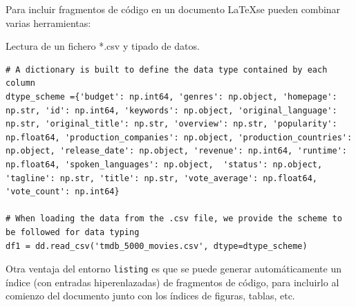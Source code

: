 \documentclass[a4paper, 12pt]{book}
\begin{document}
Para incluir fragmentos de código en un documento \LaTeX se pueden combinar varias
herramientas:


\begin{listing}[h!]
    \caption{Lectura de un fichero *.csv y tipado de datos.}{}
    \label{lst:1}
    \begin{verbatim}
# A dictionary is built to define the data type contained by each column
dtype_scheme ={'budget': np.int64, 'genres': np.object, 'homepage': np.str, 'id': np.int64, 'keywords': np.object, 'original_language': np.str, 'original_title': np.str, 'overview': np.str, 'popularity': np.float64, 'production_companies': np.object, 'production_countries': np.object, 'release_date': np.object, 'revenue': np.int64, 'runtime': np.float64, 'spoken_languages': np.object,  'status': np.object, 'tagline': np.str, 'title': np.str, 'vote_average': np.float64, 'vote_count': np.int64}

# When loading the data from the .csv file, we provide the scheme to be followed for data typing
df1 = dd.read_csv('tmdb_5000_movies.csv', dtype=dtype_scheme)
    \end{verbatim}
\end{listing}

Otra ventaja del entorno \verb|listing| es que se puede generar automáticamente un índice
(con entradas hiperenlazadas) de fragmentos de código, para incluirlo al comienzo del 
documento junto con los índices de figuras, tablas, etc.
\end{document}
